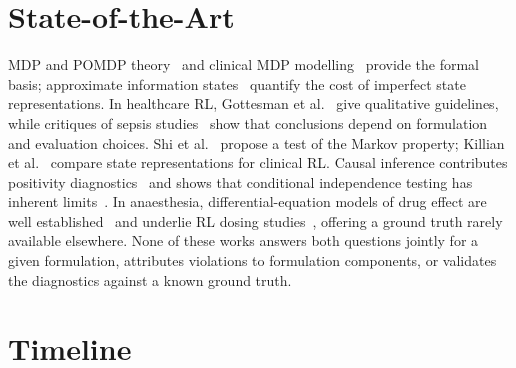 \documentclass[runningheads]{llncs}
\begin{document}
\section{State-of-the-Art}
MDP and POMDP theory~\cite{Puterman1994,Kaelbling1998} and clinical MDP modelling~\cite{Steimle2017} provide the formal basis; approximate information states~\cite{Subramanian2022} quantify the cost of imperfect state representations. In healthcare RL, Gottesman et al.~\cite{Gottesman2019} give qualitative guidelines, while critiques of sepsis studies~\cite{Jeter2019,Luo2024} show that conclusions depend on formulation and evaluation choices. Shi et al.~\cite{Shi2020} propose a test of the Markov property; Killian et al.~\cite{Killian2020} compare state representations for clinical RL. Causal inference contributes positivity diagnostics~\cite{Petersen2012} and shows that conditional independence testing has inherent limits~\cite{Shah2020}. In anaesthesia, differential-equation models of drug effect are well established~\cite{Schnider1998,Eleveld2018} and underlie RL dosing studies~\cite{Schamberg2022}, offering a ground truth rarely available elsewhere. None of these works answers both questions jointly for a given formulation, attributes violations to formulation components, or validates the diagnostics against a known ground truth.


\section{Timeline}
\end{document}
